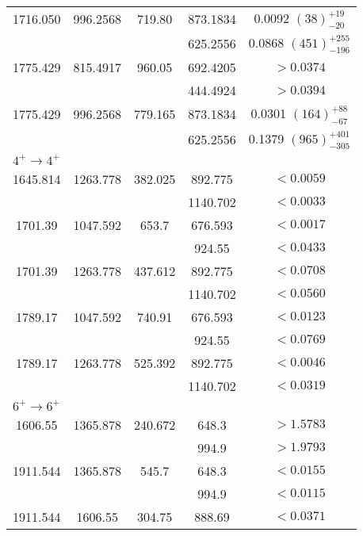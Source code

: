 \begin{longtable}{c|c|c|c|c}
        1716.050 & 996.2568 & 719.80 & 873.1834 & 0.0092 $(38)_{-20}^{+19}$  \\ 
        &  &  & 625.2556 & 0.0868 $(451)_{-196}^{+255}$  \\ \hline
        1775.429 & 815.4917 & 960.05 &  692.4205 & $>0.0374$   \\
        &  &  & 444.4924 & $>0.0394$  \\ \hline
        1775.429 & 996.2568 & 779.165 & 873.1834 & 0.0301 $(164)_{-67}^{+88}$  \\
        &  &  & 625.2556 & 0.1379 $(965)_{-305}^{+401}$  \\ \hline
        \multicolumn{5}{l}{$4^+\rightarrow 4^+$} 	\\ \hline
        1645.814 & 1263.778 & 382.025 & 892.775 & $<0.0059$  \\
         &  &  & 1140.702 & $<0.0033$  \\ \hline
        1701.39 & 1047.592 & 653.7 & 676.593 & $<0.0017$  \\
         &  &  & 924.55 & $<0.0433$  \\ \hline
        1701.39 & 1263.778 & 437.612 & 892.775 & $<0.0708$  \\
         &  &  & 1140.702 & $<0.0560$  \\ \hline
        1789.17 & 1047.592 & 740.91 & 676.593 & $<0.0123$  \\
         &  &  & 924.55 & $<0.0769$  \\ \hline
        1789.17 & 1263.778 & 525.392 & 892.775 & $<0.0046$  \\
         &  &  & 1140.702 & $<0.0319$  \\ \hline
        \multicolumn{5}{l}{$6^+\rightarrow 6^+$} 	\\ \hline
        1606.55 & 1365.878 & 240.672 & 648.3 &  $>1.5783$ \\
        &  &  & 994.9 &  $>1.9793$   \\ \hline
        1911.544 & 1365.878 & 545.7 & 648.3 &  $<0.0155$ \\
        &  &  & 994.9 &  $<0.0115$   \\ \hline
        1911.544 & 1606.55 & 304.75 & 888.69 & $<0.0371$  \\
        \bottomrule
	\end{longtable}